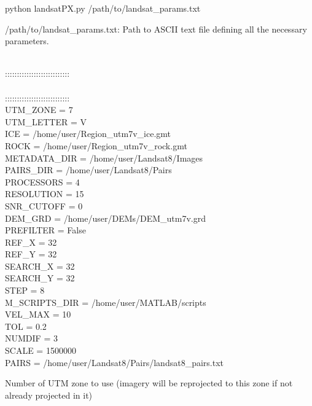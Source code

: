 \documentclass[12pt]{article}
\begin{document}

python landsatPX.py /path/to/landsat\_params.txt


/path/to/landsat\_params.txt: Path to ASCII text file defining all the necessary parameters.

 \\
\noindent ::::::::::::::::::::::::::: \\
 \\
\noindent ::::::::::::::::::::::::::: \\
UTM\_ZONE       = 7 \\
UTM\_LETTER     = V \\
ICE             = /home/user/Region\_utm7v\_ice.gmt \\
ROCK            = /home/user/Region\_utm7v\_rock.gmt \\
METADATA\_DIR   = /home/user/Landsat8/Images \\
PAIRS\_DIR      = /home/user/Landsat8/Pairs \\
PROCESSORS      = 4 \\
RESOLUTION      = 15 \\
SNR\_CUTOFF     = 0 \\
DEM\_GRD        = /home/user/DEMs/DEM\_utm7v.grd \\
PREFILTER       = False \\
REF\_X          = 32 \\
REF\_Y          = 32 \\
SEARCH\_X       = 32 \\
SEARCH\_Y       = 32 \\
STEP            = 8 \\
M\_SCRIPTS\_DIR = /home/user/MATLAB/scripts \\
VEL\_MAX        = 10 \\
TOL             = 0.2 \\
NUMDIF          = 3 \\
SCALE           = 1500000 \\
PAIRS           = /home/user/Landsat8/Pairs/landsat8\_pairs.txt \\


 Number of UTM zone to use (imagery will be reprojected to this zone if not already projected in it)
\end{document}

